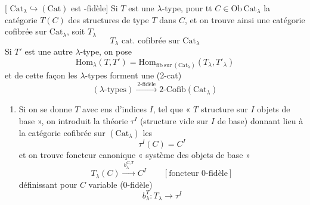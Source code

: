 \documentclass[11pt,a4paper]{article}
\begin{document}
[ $\mathrm{Cat}_{\lambda} \hookrightarrow (\mathrm{Cat})$
    est -fidèle] Si $T$ est une   $\lambda$-type,
    pour tt $C \in \mathrm{Ob}\,\mathrm{Cat}_{\lambda}$  la
    catégorie $T(C)$ des structures de type $T$ dans $C$, et on trouve
    ainsi une catégorie cofibrée sur $\mathrm{Cat}_{\lambda}$, soit
    $T_{\lambda}$
    \begin{equation}
      T_{\lambda} \text{ cat. cofibrée sur } \mathrm{Cat}_{\lambda}
      \tag{1.3}
    \end{equation}
    Si $T'$ est une autre  $\lambda$-type, on pose
    \begin{equation}
      \mathrm{Hom}_{\lambda}(T, T') =
      \mathrm{Hom}_{\mathrm{fib\ sur\ }(\mathrm{Cat}_{\lambda})}
      (T_{\lambda}, T'_{\lambda})
      \tag{1.4}
    \end{equation}
    et de cette façon les $\lambda$-types forment une (2-cat)
    \begin{equation}
      (\lambda\text{-types}) \xrightarrow{\ \text{2-fidèle}\ }
      \text{2-Cofib}(\mathrm{Cat}_{\lambda})
      \tag{1.5}
    \end{equation}

\begin{enumerate}
  \item[{[2]}] Si on se donne $T$ avec ens d'indices $I$, tel que
    « $T$ structure sur $I$ objets de
    base », on introduit la théorie $\tau^{I}$ (structure vide sur $I$
     de base) donnant lieu à la catégorie
    cofibrée sur $(\mathrm{Cat}_{\lambda})$  les
    \begin{equation}
      \tau^{I}(C) = C^{I}
      \tag{2.1}
    \end{equation}
    et on trouve   \struck{\ill{}}
    foncteur canonique « système des objets de base » 
    \begin{equation}
      T_{\lambda}(C) \xrightarrow{\ b^{C,T}_{\lambda}\ } C^{I}
      \qquad [\text{foncteur 0-fidèle}]
      \tag{2.2}
    \end{equation}
    définissant pour $C$ variable (0-fidèle)
    \begin{equation}
      b^{T}_{\lambda} : T_{\lambda} \longrightarrow \tau^{I}
      \tag{2.3}
    \end{equation}
\end{enumerate}
\end{document}
